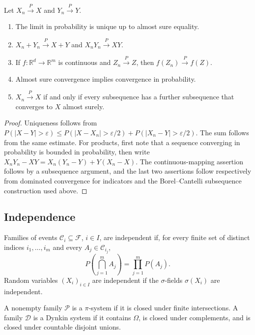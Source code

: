 \begin{prop}
Let $X_n\xrightarrow{P}X$ and $Y_n\xrightarrow{P}Y$.
\begin{enumerate}[label=(\roman*)]
  \item The limit in probability is unique up to almost sure equality.
  \item $X_n+Y_n\xrightarrow{P}X+Y$ and
  $X_nY_n\xrightarrow{P}XY$.
  \item If $f:\mathbb R^d\to\mathbb R^m$ is continuous and
  $Z_n\xrightarrow{P}Z$, then $f(Z_n)\xrightarrow{P}f(Z)$.
  \item Almost sure convergence implies convergence in probability.
  \item $X_n\xrightarrow{P}X$ if and only if every subsequence has a further
  subsequence that converges to $X$ almost surely.
\end{enumerate}
\end{prop}

\begin{proof}
Uniqueness follows from
$P(|X-Y|>\varepsilon)\leq
P(|X-X_n|>\varepsilon/2)+P(|X_n-Y|>\varepsilon/2)$.
The sum follows from the same estimate. For products, first note that a
sequence converging in probability is bounded in probability, then write
$X_nY_n-XY=X_n(Y_n-Y)+Y(X_n-X)$. The continuous-mapping assertion follows by
a subsequence argument, and the last two assertions follow respectively from
dominated convergence for indicators and the Borel--Cantelli subsequence
construction used above.
\end{proof}

\subsection{Independence}

\begin{de}
Families of events $\mathcal C_i\subseteq\mathcal F$, $i\in I$, are
independent if, for every finite set of distinct indices
$i_1,\ldots,i_m$ and every $A_j\in\mathcal C_{i_j}$,
\[
P\!\left(\bigcap_{j=1}^{m}A_j\right)
 =\prod_{j=1}^{m}P(A_j).
\]
Random variables $(X_i)_{i\in I}$ are independent if the $\sigma$-fields
$\sigma(X_i)$ are independent.
\end{de}

\begin{de}
A nonempty family $\mathcal P$ is a $\pi$-system if it is closed under finite
intersections. A family $\mathcal D$ is a Dynkin system if it contains
$\Omega$, is closed under complements, and is closed under countable disjoint
unions.
\end{de}

